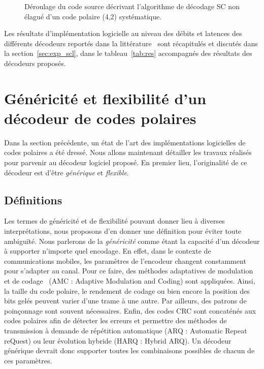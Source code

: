 \begin{figure}[t]
{\begin{minipage}{.35\linewidth}
  \label{fig:unrolled_tree}
  \end{minipage}%
  }
  \caption{Déroulage du code source décrivant l'algorithme de décodage SC non élagué d'un code polaire (4,2) systématique.}
  \label{fig:unrolling}
\end{figure}

Les résultats d'implémentation logicielle au niveau des débits et latences des différents décodeurs reportés dans la littérature~\cite{sarkis_fast_2016,sarkis_increasing_2014,shen_low-latency_2016} sont récapitulés et discutés dans la section~\ref{sec:exp_scl}, dans le tableau~\ref{tab:res} accompagnés des résultats des décodeurs proposés.

\section{Généricité et flexibilité d'un décodeur de codes polaires}
\label{sec:gen_scl}

Dans la section précédente, un état de l'art des implémentations logicielles de codes polaires a été dressé. Nous allons maintenant détailler les travaux réalisés pour parvenir au décodeur logiciel proposé. En premier lieu, l'originalité de ce décodeur est d'être \textit{générique} et \textit{flexible}.

\subsection{Définitions}
Les termes de généricité et de flexibilité pouvant donner lieu à diverses interprétations, nous proposons d'en donner une définition pour éviter toute ambiguïté.
Nous parlerons de la \textit{généricité} comme étant la capacité d'un décodeur à supporter n'importe quel encodage.
En effet, dans le contexte de communications mobiles, les paramètres de l'encodeur changent constamment pour s'adapter au canal. Pour ce faire, des méthodes adaptatives de modulation et de codage~\cite{dahlman_4g:_2013} (AMC : Adaptive Modulation and Coding) sont appliquées. Ainsi, la taille du code polaire, le rendement de codage ou bien encore la position des bits gelés peuvent varier d'une trame à une autre. Par ailleurs, des patrons de poinçonnage sont souvent nécessaires. Enfin, des codes CRC sont concaténés aux codes polaires afin de détecter les erreurs et permettre des méthodes de transmission à demande de répétition automatique (ARQ : Automatic Repeat reQuest) ou leur évolution hybride (HARQ : Hybrid ARQ). Un décodeur générique devrait donc supporter toutes les combinaisons possibles de chacun de ces paramètres.

